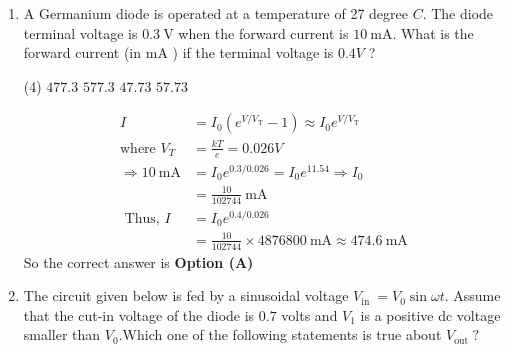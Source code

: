 \begin{enumerate}
\begin{figure}[H]
\centering
\texttt{[image: diagram-20210816(18)-crop]}
\end{figure}
\begin{tasks}(2)
\task[\textbf{A.}] \begin{figure}[H]
	\centering
	\texttt{[image: diagram-20210816(24)-crop]}
\end{figure}
\task[\textbf{B.}] \begin{figure}[H]
	\centering
	\texttt{[image: diagram-20210816(25)-crop]}
\end{figure}
\task[\textbf{C.}] \begin{figure}[H]
	\centering
	\texttt{[image: diagram-20210816(28)-crop]}
\end{figure}
\task[\textbf{D.}] \begin{figure}[H]
	\centering
	\texttt{[image: diagram-20210816(27)-crop]}
\end{figure}
\end{tasks}
\begin{answer}
\begin{align*}
\text{Transition voltage }V_{T}&=\pm 0.7 V
\intertext{When diodes are ON, output voltage will be either $+0.7 \mathrm{~V}$ and $-0.7 \mathrm{~V}$.}
\end{align*}
So the correct answer is \textbf{Option (B)}
\end{answer}
	\item A Germanium diode is operated at a temperature of 27 degree $C$. The diode terminal voltage is $0.3 \mathrm{~V}$ when the forward current is $10 \mathrm{~mA}$. What is the forward current (in $\mathrm{mA}$ ) if the terminal voltage is $0.4 V$ ?
{}

\begin{tasks}(4)
\task[\textbf{A.}] $477.3$
\task[\textbf{B.}] $577.3$
\task[\textbf{C.}] $47.73$
\task[\textbf{D.}] $57.73$
\end{tasks}
\begin{answer}
\begin{align*}
I&=I_{0}\left(e^{V / V_{\mathrm{T}}}-1\right) \approx I_{0} e^{V / V_{\mathrm{T}}}\\ \text{where }V_{T}&=\frac{k T}{e}=0.026 V\\
\Rightarrow 10 \mathrm{~mA}&=I_{0} e^{0.3 / 0.026}=I_{0} e^{11.54} \Rightarrow I_{0}\\&=\frac{10}{102744} \mathrm{~mA}\\
\text{	Thus, }I&=I_{0} e^{0.4 / 0.026}\\&=\frac{10}{102744} \times 4876800 \mathrm{~mA} \approx 474.6 \mathrm{~mA}
\end{align*}
So the correct answer is \textbf{Option (A)}
\end{answer}
\item The circuit given below is fed by a sinusoidal voltage $V_{\text {in }}=V_{0} \sin \omega t .$ Assume that the
cut-in voltage of the diode is $0.7$ volts and $V_{1}$ is a positive dc voltage smaller than $V_{0}$.Which one of the following statements is true about $V_{\text {out }} ?$
{}


\end{enumerate}
